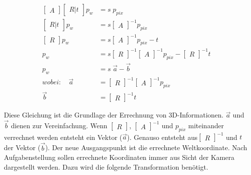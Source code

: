 		\begin{equation}
			\begin{aligned}
				 \begin{bmatrix} A \end{bmatrix} \begin{bmatrix} R|t \end{bmatrix} p_w &= s \; p_{pix} \\
				 \begin{bmatrix} R|t \end{bmatrix} p_w &= s \begin{bmatrix} A \end{bmatrix}^{-1} p_{pix} \\
				 \begin{bmatrix} R \end{bmatrix} p_w &= s \begin{bmatrix} A \end{bmatrix}^{-1} p_{pix} - t \\
				 p_w &= s \begin{bmatrix} R \end{bmatrix}^{-1} \begin{bmatrix} A \end{bmatrix}^{-1} p_{pix} - \begin{bmatrix} R \end{bmatrix}^{-1} t \\
				 p_w &= s \; \vec{a} - \vec{b} \\
				 wobei: \quad \vec{a} & = \begin{bmatrix} R \end{bmatrix}^{-1} \begin{bmatrix} A \end{bmatrix}^{-1} p_{pix} \\
				 \vec{b} &= \begin{bmatrix} R \end{bmatrix}^{-1} t
			\end{aligned}
			\label{eq:pixel_zu_welt}
		\end{equation}
		
		Diese Gleichung ist die Grundlage der Errechnung von 3D-Informationen. \( \vec{a} \) und \( \vec{b} \) dienen zur Vereinfachung. Wenn \( \begin{bmatrix} R \end{bmatrix} \), \( \begin{bmatrix} A \end{bmatrix}^{-1} \) und \( p_{pix} \) miteinander verrechnet werden entsteht ein Vektor (\( \vec{a} \)). Genauso entsteht aus\( \begin{bmatrix} R \end{bmatrix}^{-1} \) und \( t \) der Vektor (\( \vec{b} \)). \newline
		Der neue Ausgangspunkt ist die errechnete Weltkoordinate. Nach Aufgabenstellung sollen errechnete Koordinaten immer aus Sicht der Kamera dargestellt werden. Dazu wird die folgende Transformation benötigt. 
		
